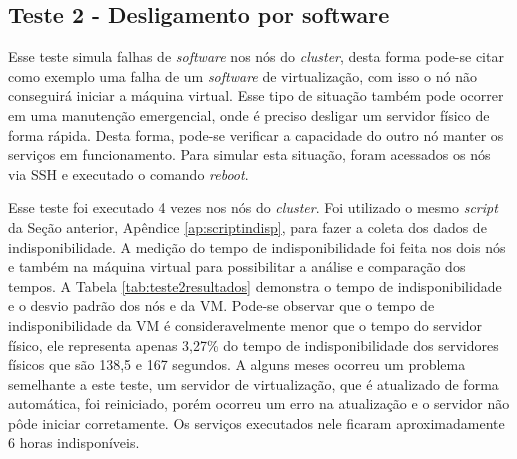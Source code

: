 \subsection{Teste 2 - Desligamento por software}

Esse teste simula falhas de \textit{software} nos nós do \textit{cluster}, desta forma pode-se citar como exemplo uma falha de um \textit{software} 
de virtualização, com isso o nó não conseguirá iniciar a máquina virtual. Esse tipo de situação também pode ocorrer em uma manutenção emergencial, 
onde é preciso desligar um servidor físico de forma rápida. Desta forma, pode-se verificar a capacidade do outro nó manter os serviços
em funcionamento. Para simular esta situação, foram acessados os nós via \ac{SSH} e executado o comando \textit{reboot}.


Esse teste foi executado 4 vezes nos nós do \textit{cluster}. Foi utilizado o mesmo \textit{script} da Seção anterior, Apêndice 
\ref{ap:scriptindisp}, para fazer a coleta dos dados de indisponibilidade. A medição do tempo de indisponibilidade foi feita nos dois nós e 
também na máquina virtual para possibilitar a análise e comparação dos tempos. A Tabela \ref{tab:teste2resultados} demonstra o tempo de 
indisponibilidade e o desvio padrão dos nós e da \ac{VM}. Pode-se observar que o tempo de indisponibilidade da \ac{VM} é 
consideravelmente menor que o tempo do servidor físico, ele representa apenas 3,27\% do tempo de indisponibilidade dos servidores físicos que são 
138,5 e 167 segundos. A alguns meses ocorreu um problema semelhante a este teste, um servidor de virtualização, que é atualizado de forma 
automática, foi reiniciado, porém ocorreu um erro na atualização e o servidor não pôde iniciar corretamente. Os serviços executados nele ficaram 
aproximadamente 6 horas indisponíveis.

